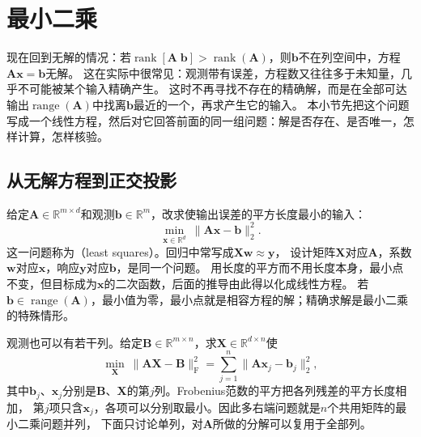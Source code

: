 \section{最小二乘}

\label{sec:ls-least-squares}
\label{sec:linear-algebra-residual-systems}
\label{sec:linear-algebra-projection-least-squares}
\label{sec:matrix-analysis-inverse-input-selection}

现在回到无解的情况：若$\operatorname{rank}[\bm A\;\bm b]>\operatorname{rank}(\bm A)$，则$\bm b$不在列空间中，方程$\bm A\bm x=\bm b$无解。
这在实际中很常见：观测带有误差，方程数又往往多于未知量，几乎不可能被某个输入精确产生。
这时不再寻找不存在的精确解，而是在全部可达输出$\operatorname{range}(\bm A)$中找离$\bm b$最近的一个，再求产生它的输入。
本小节先把这个问题写成一个线性方程，然后对它回答前面的同一组问题：解是否存在、是否唯一，怎样计算，怎样核验。

\subsection{从无解方程到正交投影}
\label{sec:ls-ordinary-ls}
\label{sec:ls-least-squares-objective}
\label{sec:ls-subspace-nearest-points}
\label{sec:linear-algebra-decomposition-projection}

给定$\bm A\in\mathbb R^{m\times d}$和观测$\bm b\in\mathbb R^m$，改求使输出误差的平方长度最小的输入：
\begin{equation}
 \min_{\bm x\in\mathbb R^d}\ \lVert\bm A\bm x-\bm b\rVert_2^2.
 \label{eq:linear-algebra-least-squares}
\end{equation}
这一问题称为（least squares）。回归中常写成$\bm X\bm w\approx\bm y$，
设计矩阵$\bm X$对应$\bm A$，系数$\bm w$对应$\bm x$，响应$\bm y$对应$\bm b$，是同一个问题。
用长度的平方而不用长度本身，最小点不变，但目标成为$\bm x$的二次函数，后面的推导由此得以化成线性方程。
若$\bm b\in\operatorname{range}(\bm A)$，最小值为零，最小点就是相容方程的解；精确求解是最小二乘的特殊情形。

观测也可以有若干列。给定$\bm B\in\mathbb R^{m\times n}$，求$\bm X\in\mathbb R^{d\times n}$使
\begin{equation}
 \min_{\bm X}\ \lVert\bm A\bm X-\bm B\rVert_{\mathrm F}^2
 =\sum_{j=1}^n\lVert\bm A\bm x_j-\bm b_j\rVert_2^2,
 \label{eq:ls-multi-right-frobenius}
\end{equation}
其中$\bm b_j$、$\bm x_j$分别是$\bm B$、$\bm X$的第$j$列。Frobenius范数的平方把各列残差的平方长度相加，
第$j$项只含$\bm x_j$，各项可以分别取最小。因此多右端问题就是$n$个共用矩阵的最小二乘问题并列，
下面只讨论单列，对$\bm A$所做的分解可以复用于全部列。

